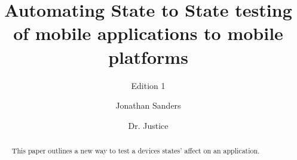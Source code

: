 \documentclass[sigconf]{acmart}
\begin{document}
\title{Automating State to State testing of mobile applications to mobile platforms}
\subtitle{Edition 1}


\author{Jonathan Sanders}

\author{Dr. Justice}


\renewcommand{\shortauthors}{B. Trovato et al.}


\begin{abstract}
This paper outlines a new way to test a devices states' affect on an application.  
\end{abstract}





\maketitle




 
\end{document}

